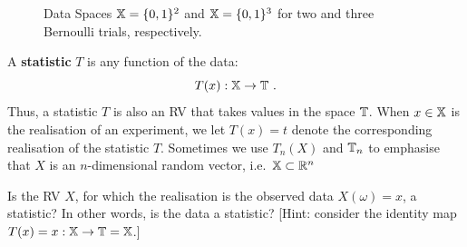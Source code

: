 \begin{figure}
\caption{Data Spaces $\mathbb{X}=\{0,1\}^2$ and $\mathbb{X}=\{0,1\}^3$ for two and three Bernoulli trials, respectively.\label{F:BernoulliDataSpace2and3}}
\centering   {}
\end{figure}

\begin{definition}[Statistic]\label{D:Statistic}
A {\bf statistic} $T$ is any 
function of the data:
\[
T(x) : \mathbb{X} \to \mathbb{T} \ .
\]
Thus, a statistic $T$ is also an RV that takes values in the space $\mathbb{T}$.  When $x \in \mathbb{X}$ is the realisation of an experiment, we let $T(x)=t$ denote the corresponding realisation of the statistic $T$. Sometimes we use $T_n(X)$ and $\mathbb{T}_n$ to emphasise that $X$ is an $n$-dimensional random vector, i.e.~$\mathbb{X} \subset \mathbb{R}^n$ 
\end{definition}

\begin{classwork}
Is the RV $X$, for which the realisation is the observed data $X(\omega)=x$, a statistic?  In other words, is the data a statistic? [Hint: consider the identity map $T(x)=x: \mathbb{X} \to \mathbb{T}=\mathbb{X}$.]
\end{classwork}

